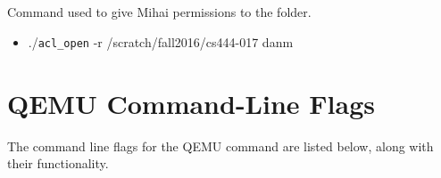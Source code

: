 \documentclass[letterpaper,10pt,onecolumn]{IEEEtran}
\begin{document}
    \subsection*{}Command used to give Mihai permissions to the folder.
    \begin{itemize}
        \item ./\texttt{acl\_open} -r /scratch/fall2016/cs444-017 danm
    \end{itemize}
    
    \vspace{7mm}
    
    \section*{QEMU Command-Line Flags}
    The command line flags for the QEMU command are listed below, along with their functionality.
\end{document}
